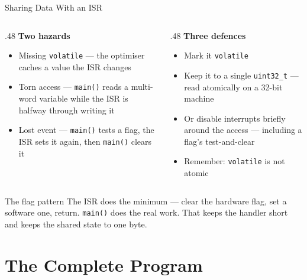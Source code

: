 \documentclass[9pt,aspectratio=169,xcolor=table]{beamer}
\begin{document}
\begin{frame}{Sharing Data With an ISR}
    \begin{columns}[T]
    \begin{column}{.48\textwidth}
        \textbf{Two hazards}
        {\small
        \begin{itemize}\itemsep1pt
            \item \alert{Missing \texttt{volatile}} --- the optimiser caches a
                  value the ISR changes
            \item \alert{Torn access} --- \texttt{main()} reads a multi-word
                  variable while the ISR is halfway through writing it
            \item \alert{Lost event} --- \texttt{main()} tests a flag, the ISR sets it again, then \texttt{main()} clears it
        \end{itemize}}
    \end{column}
    \begin{column}{.48\textwidth}
        \textbf{Three defences}
        {\small
        \begin{itemize}\itemsep1pt
            \item Mark it \texttt{volatile}
            \item Keep it to a single \texttt{uint32\_t} --- read atomically on a
                  32-bit machine
            \item Or disable interrupts \alert{briefly} around the access --- including a flag's test-and-clear
            \item Remember: \texttt{volatile} is \alert{not} atomic
        \end{itemize}}
    \end{column}
    \end{columns}

    \vspace{3mm}
    \begin{block}{The flag pattern}
        The ISR does the minimum --- clear the hardware flag, set a software one,
        return. \texttt{main()} does the real work. That keeps the handler short
        \alert{and} keeps the shared state to one byte.
    \end{block}
\end{frame}


\section{The Complete Program}
\end{document}
